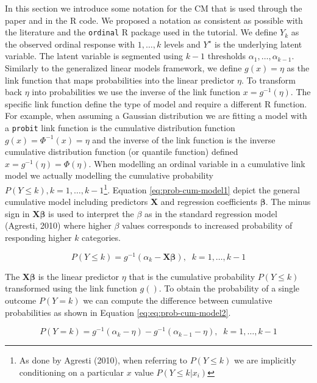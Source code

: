 \documentclass[
  man,floatsintext]{apa6}
\begin{document}
In this section we introduce some notation for the CM that is used through the paper and in the R code. We proposed a notation as consistent as possible with the literature and the \texttt{ordinal} R package used in the tutorial. We define \(Y_k\) as the observed ordinal response with \(1, \dots, k\) levels and \(Y^\star\) is the underlying latent variable. The latent variable is segmented using \(k - 1\) thresholds \(\alpha_1, \dots, \alpha_{k - 1}\). Similarly to the generalized linear models framework, we define \(g(x) = \eta\) as the link function that maps probabilities into the linear predictor \(\eta\). To transform back \(\eta\) into probabilities we use the inverse of the link function \(x = g^{-1}(\eta)\). The specific link function define the type of model and require a different R function. For example, when assuming a Gaussian distribution we are fitting a model with a \texttt{probit} link function is the cumulative distribution function \(g(x) = \Phi^{-1}(x) = \eta\) and the inverse of the link function is the inverse cumulative distribution function (or quantile function) defined \(x = g^{-1}(\eta) = \Phi(\eta)\). When modelling an ordinal variable in a cumulative link model we actually modelling the cumulative probability \(P(Y \leq k), k = 1, \dots, k - 1\)\footnote{As done by Agresti (2010), when referring to \(P(Y \leq k)\) we are implicitly conditioning on a particular \(x\) value \(P(Y \leq k | x_i)\)}. Equation \eqref{eq:prob-cum-model1} depict the general cumulative model including predictors \(\mathbf{X}\) and regression coefficients \(\boldsymbol{\beta}\). The minus sign in \(\mathbf{X} \boldsymbol{\beta}\) is used to interpret the \(\beta\) as in the standard regression model (Agresti, 2010) where higher \(\beta\) values corresponds to increased probability of responding higher \(k\) categories.

\begin{equation} 
P(Y \leq k) = g^{-1}(\alpha_k - \mathbf{X} \boldsymbol{\beta}), \;\;k = 1, \dots, k - 1
\label{eq:prob-cum-model1}
\end{equation}

The \(\mathbf{X} \boldsymbol{\beta}\) is the linear predictor \(\eta\) that is the cumulative probability \(P(Y \leq k)\) transformed using the link function \(g()\). To obtain the probability of a single outcome \(P(Y = k)\) we can compute the difference between cumulative probabilities as shown in Equation \eqref{eq:eq:prob-cum-model2}.

\begin{equation} 
P(Y = k) = g^{-1}(\alpha_k - \eta) -  g^{-1}(\alpha_{k - 1} - \eta), \;\;k = 1, \dots, k - 1
\label{eq:prob-cum-model2}
\end{equation}
\end{document}
